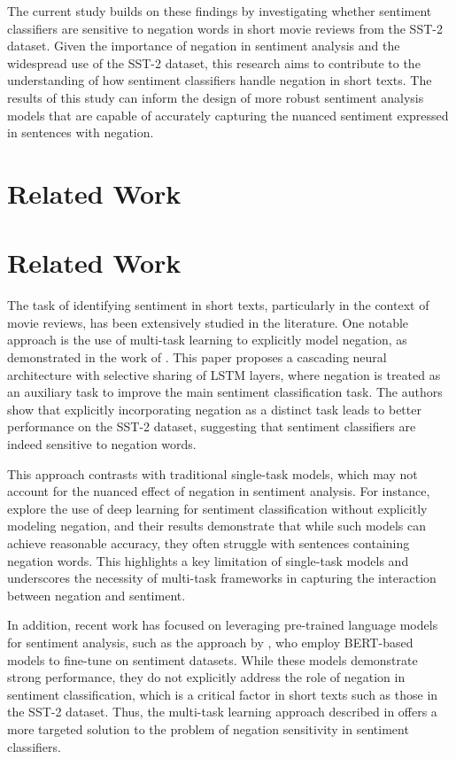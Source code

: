 \documentclass{article}
\begin{document}
The current study builds on these findings by investigating whether sentiment classifiers are sensitive to negation words in short movie reviews from the SST-2 dataset. Given the importance of negation in sentiment analysis and the widespread use of the SST-2 dataset, this research aims to contribute to the understanding of how sentiment classifiers handle negation in short texts. The results of this study can inform the design of more robust sentiment analysis models that are capable of accurately capturing the nuanced sentiment expressed in sentences with negation.
\section{Related Work}
\section*{Related Work}

The task of identifying sentiment in short texts, particularly in the context of movie reviews, has been extensively studied in the literature. One notable approach is the use of multi-task learning to explicitly model negation, as demonstrated in the work of \citet{DBLP:journals/corr/abs-1906-07610}. This paper proposes a cascading neural architecture with selective sharing of LSTM layers, where negation is treated as an auxiliary task to improve the main sentiment classification task. The authors show that explicitly incorporating negation as a distinct task leads to better performance on the SST-2 dataset, suggesting that sentiment classifiers are indeed sensitive to negation words. 

This approach contrasts with traditional single-task models, which may not account for the nuanced effect of negation in sentiment analysis. For instance, \citet{DBLP:journals/tkde/ChenWZ15} explore the use of deep learning for sentiment classification without explicitly modeling negation, and their results demonstrate that while such models can achieve reasonable accuracy, they often struggle with sentences containing negation words. This highlights a key limitation of single-task models and underscores the necessity of multi-task frameworks in capturing the interaction between negation and sentiment. 

In addition, recent work has focused on leveraging pre-trained language models for sentiment analysis, such as the approach by \citet{DBLP:journals/taslp/WeiLZ20}, who employ BERT-based models to fine-tune on sentiment datasets. While these models demonstrate strong performance, they do not explicitly address the role of negation in sentiment classification, which is a critical factor in short texts such as those in the SST-2 dataset. Thus, the multi-task learning approach described in \citet{DBLP:journals/corr/abs-1906-07610} offers a more targeted solution to the problem of negation sensitivity in sentiment classifiers. 
\end{document}
